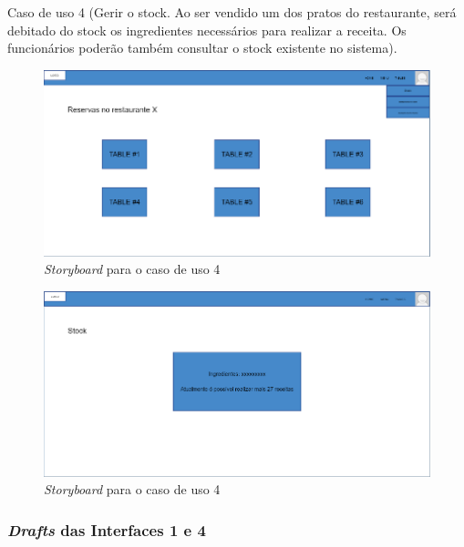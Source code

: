 Caso de uso 4 (Gerir o stock. Ao ser vendido um dos pratos do restaurante, será debitado do stock os ingredientes necessários para realizar a receita. Os funcionários poderão também consultar o stock existente no sistema).

\begin{figure}[!hbt]
    \centering
    \includegraphics[width=14cm]{Resources/Previous/image-108.png}
    \caption{\textit{Storyboard} para o caso de uso 4}
    
\end{figure}
\FloatBarrier
\begin{figure}[!hbt]
    \centering
    \includegraphics[width=14cm]{Resources/Previous/image-109.png}
    \caption{\textit{Storyboard} para o caso de uso 4}
    
\end{figure}
\FloatBarrier

\subsubsection{\textit{Drafts} das Interfaces 1 e 4}

